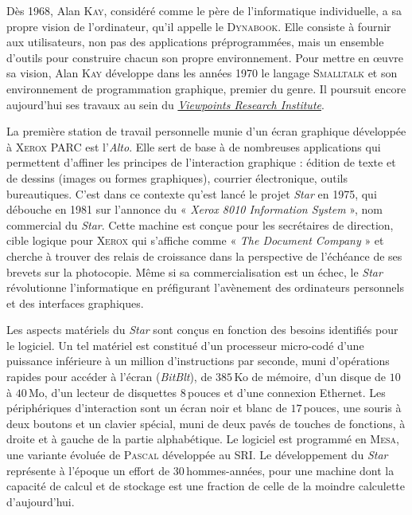 Dès 1968, Alan \textsc{Kay}, considéré comme le père de l'informatique individuelle, a sa propre vision de l'ordinateur, qu'il appelle le \textsc{Dynabook}. Elle consiste à fournir aux utilisateurs, non pas des applications préprogrammées, mais un ensemble d'outils pour construire chacun son propre environnement. Pour mettre en œuvre sa vision, Alan \textsc{Kay} développe dans les années 1970 le langage \textsc{Smalltalk} et son environnement de programmation graphique, premier du genre. Il poursuit encore aujourd'hui ses travaux au sein du \href{http://www.vpri.org/}{\textit{Viewpoints Research Institute}}.

La première station de travail personnelle munie d'un écran graphique développée à \textsc{Xerox} PARC est l’\textit{Alto}. Elle sert de base à de nombreuses applications qui permettent d'affiner les principes de l'interaction graphique : édition de texte et de dessins (images ou formes graphiques), courrier électronique, outils bureautiques. C'est dans ce contexte qu'est lancé le projet \textit{Star} en 1975, qui débouche en 1981 sur l'annonce du « \textit{Xerox 8010 Information System} », nom commercial du \textit{Star}. Cette machine est conçue pour les secrétaires de direction, cible logique pour \textsc{Xerox} qui s’affiche comme « \textit{The Document Company} » et cherche à trouver des relais de croissance dans la perspective de l’échéance de ses brevets sur la photocopie. Même si sa commercialisation est un échec, le \textit{Star} révolutionne l'informatique en préfigurant l'avènement des ordinateurs personnels et des interfaces graphiques.

Les aspects matériels du \textit{Star} sont conçus en fonction des besoins identifiés pour le logiciel. Un tel matériel est constitué d'un processeur micro-codé d'une puissance inférieure à un million d'instructions par seconde, muni d'opérations rapides pour accéder à l'écran (\textit{BitBlt}), de $385$\,Ko de mémoire, d'un disque de $10$ à $40$\,Mo, d'un lecteur de disquettes $8$\,pouces et d'une connexion Ethernet. Les périphériques d'interaction sont un écran noir et blanc de $17$\,pouces, une souris à deux boutons et un clavier spécial, muni de deux pavés de touches de fonctions, à droite et à gauche de la partie alphabétique. Le logiciel est programmé en \textsc{Mesa}, une variante évoluée de \textsc{Pascal} développée au SRI. Le développement du \textit{Star} représente à l'époque un effort de $30$\,hommes-années, pour une machine dont la capacité de calcul et de stockage est une fraction de celle de la moindre calculette d’aujourd’hui.

